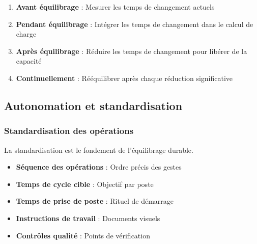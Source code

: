 \documentclass[12pt,a4paper]{article}
\newenvironment{methodbox}[1]
  {\begin{tcolorbox}[colback=blue!5!white, colframe=methodcolor, title=#1]\small}
  {\end{tcolorbox}}
\begin{document}
\begin{enumerate}
    \item \textbf{Avant équilibrage} : Mesurer les temps de changement actuels
    \item \textbf{Pendant équilibrage} : Intégrer les temps de changement dans le calcul de charge
    \item \textbf{Après équilibrage} : Réduire les temps de changement pour libérer de la capacité
    \item \textbf{Continuellement} : Rééquilibrer après chaque réduction significative
\end{enumerate}

\begin{center}
\end{center}

\subsection{Autonomation et standardisation}

\subsubsection{Standardisation des opérations}

La standardisation est le fondement de l'équilibrage durable.

\begin{methodbox}{Éléments à standardiser}
\begin{itemize}
    \item \textbf{Séquence des opérations} : Ordre précis des gestes
    \item \textbf{Temps de cycle cible} : Objectif par poste
    \item \textbf{Temps de prise de poste} : Rituel de démarrage
    \item \textbf{Instructions de travail} : Documents visuels
    \item \textbf{Contrôles qualité} : Points de vérification
\end{itemize}
\end{methodbox}
\end{document}
